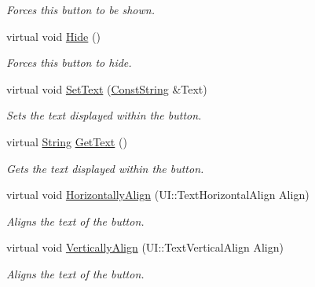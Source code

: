 \begin{DoxyCompactItemize}
\begin{DoxyCompactList}\small\item\em Forces this button to be shown. \item\end{DoxyCompactList}\item 
\hypertarget{classphys_1_1UI_1_1TextButton_aef823890ba8c829183f1b618473c1bac}{
virtual void \hyperlink{classphys_1_1UI_1_1TextButton_aef823890ba8c829183f1b618473c1bac}{Hide} ()}
\label{df/d03/classphys_1_1UI_1_1TextButton_aef823890ba8c829183f1b618473c1bac}

\begin{DoxyCompactList}\small\item\em Forces this button to hide. \item\end{DoxyCompactList}\item 
virtual void \hyperlink{classphys_1_1UI_1_1TextButton_ae66f149489c4215963dc5b853c838c50}{SetText} (\hyperlink{namespacephys_a5ce5049f8b4bf88d6413c47b504ebb31}{ConstString} \&Text)
\begin{DoxyCompactList}\small\item\em Sets the text displayed within the button. \item\end{DoxyCompactList}\item 
virtual \hyperlink{namespacephys_aa03900411993de7fbfec4789bc1d392e}{String} \hyperlink{classphys_1_1UI_1_1TextButton_a8dc28f2fa610dc9bb72e5886613996bd}{GetText} ()
\begin{DoxyCompactList}\small\item\em Gets the text displayed within the button. \item\end{DoxyCompactList}\item 
virtual void \hyperlink{classphys_1_1UI_1_1TextButton_a71a64810f262725992dbeec194e8497c}{HorizontallyAlign} (UI::TextHorizontalAlign Align)
\begin{DoxyCompactList}\small\item\em Aligns the text of the button. \item\end{DoxyCompactList}\item 
virtual void \hyperlink{classphys_1_1UI_1_1TextButton_a7319f855026794c9c42f292093d1351f}{VerticallyAlign} (UI::TextVerticalAlign Align)
\begin{DoxyCompactList}\small\item\em Aligns the text of the button. \item\end{DoxyCompactList}\item 

\end{DoxyCompactItemize}
